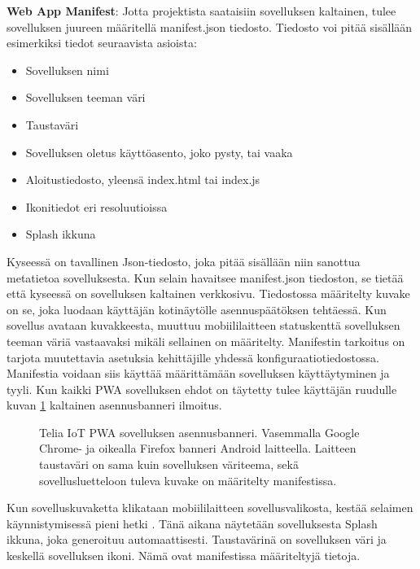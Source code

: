 \documentclass{tktltiki}
\begin{document}
\textbf{Web App Manifest}: Jotta projektista saataisiin sovelluksen kaltainen, tulee sovelluksen juureen määritellä manifest.json tiedosto. Tiedosto voi pitää sisällään esimerkiksi tiedot seuraavista asioista:

\begin{itemize}
  \item Sovelluksen nimi
  \item Sovelluksen teeman väri
  \item Taustaväri
  \item Sovelluksen oletus käyttöasento, joko pysty, tai vaaka
  \item Aloitustiedosto, yleensä index.html tai index.js
  \item Ikonitiedot eri resoluutioissa
  \item Splash ikkuna
\end{itemize}

Kyseessä on tavallinen Json-tiedosto, joka pitää sisällään niin sanottua metatietoa sovelluksesta. Kun selain havaitsee manifest.json tiedoston, se tietää että kyseessä on sovelluksen kaltainen verkkosivu. Tiedostossa määritelty kuvake on se, joka luodaan käyttäjän kotinäytölle asennuspäätöksen tehtäessä. Kun sovellus avataan kuvakkeesta, muuttuu mobiililaitteen statuskenttä sovelluksen teeman väriä vastaavaksi mikäli sellainen on määritelty. Manifestin tarkoitus on tarjota muutettavia asetuksia kehittäjille yhdessä konfiguraatiotiedostossa. \cite{biorn2017progressive} Manifestia voidaan siis käyttää määrittämään sovelluksen käyttäytyminen ja tyyli. Kun kaikki PWA sovelluksen ehdot on täytetty tulee käyttäjän ruudulle kuvan \ref{asennusbanneri} kaltainen asennusbanneri ilmoitus.

\begin{figure}[!ht]
\begin{center}
\caption{Telia IoT PWA sovelluksen asennusbanneri. Vasemmalla Google Chrome- ja oikealla Firefox banneri Android laitteella. Laitteen taustaväri on sama kuin sovelluksen väriteema, sekä sovellusluetteloon tuleva kuvake on määritelty manifestissa.}
\label{asennusbanneri}
\end{center}
\end{figure}

Kun sovelluskuvaketta klikataan mobiililaitteen sovellusvalikosta, kestää selaimen käynnistymisessä pieni hetki \cite{hiltunen2018creating}. Tänä aikana näytetään sovelluksesta Splash ikkuna, joka generoituu automaattisesti. Taustavärinä on sovelluksen väri ja keskellä sovelluksen ikoni. Nämä ovat manifestissa määriteltyjä tietoja.
\end{document}
